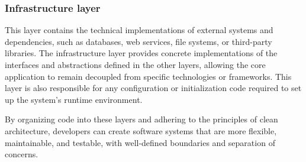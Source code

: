 \subsubsection{Infrastructure layer}
This layer contains the technical implementations of external systems and dependencies,
such as databases, web services, file systems, or third-party libraries. The
infrastructure layer provides concrete implementations of the interfaces and abstractions
defined in the other layers, allowing the core application to remain decoupled from
specific technologies or frameworks. This layer is also responsible for any configuration
or initialization code required to set up the system's runtime environment.

By organizing code into these layers and adhering to the principles of clean architecture,
developers can create software systems that are more flexible, maintainable, and testable,
with well-defined boundaries and separation of concerns.